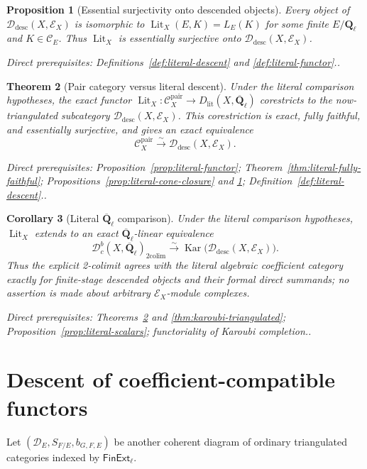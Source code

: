 \documentclass[10pt]{article}
\newtheorem{theorem}{Theorem}[section]
\newtheorem{proposition}[theorem]{Proposition}
\newtheorem{corollary}[theorem]{Corollary}
\theoremstyle{definition}
\newcommand{\Ql}{\mathbf Q_\ell}
\newcommand{\Qlb}{\overline{\mathbf Q}_\ell}
\newcommand{\Dbc}{\mathcal D^b_c}
\newcommand{\Kar}{\operatorname{Kar}}
\newcommand{\Pair}{\mathcal C_X^{\mathrm{pair}}}
\newcommand{\depends}[1]{\par\smallskip\noindent\textit{Direct prerequisites:} #1.}
\begin{document}
\begin{proposition}[Essential surjectivity onto descended objects]
\label{prop:literal-essential-surjectivity}
Every object of $\mathcal D_{\mathrm{desc}}(X,\mathcal E_X)$ is isomorphic
to $\operatorname{Lit}_X(E,K)=L_E(K)$ for some finite $E/\Ql$ and
$K\in\mathcal C_E$.  Thus $\operatorname{Lit}_X$ is essentially
surjective onto $\mathcal D_{\mathrm{desc}}(X,\mathcal E_X)$.
\depends{Definitions~\ref{def:literal-descent} and
\ref{def:literal-functor}.}
\end{proposition}

\begin{theorem}[Pair category versus literal descent]
\label{thm:pair-literal}
Under the literal comparison hypotheses, the exact functor
$\operatorname{Lit}_X:\Pair\to D_{\mathrm{lit}}(X,\Qlb)$ corestricts to
the now-triangulated subcategory
$\mathcal D_{\mathrm{desc}}(X,\mathcal E_X)$.  This corestriction is exact,
fully faithful, and essentially surjective, and gives an exact equivalence
\[
 \Pair\xrightarrow{\sim}
 \mathcal D_{\mathrm{desc}}(X,\mathcal E_X).
\]
\depends{Proposition~\ref{prop:literal-functor};
Theorem~\ref{thm:literal-fully-faithful};
Propositions~\ref{prop:literal-cone-closure} and
\ref{prop:literal-essential-surjectivity};
Definition~\ref{def:literal-descent}.}
\end{theorem}

\begin{corollary}[Literal $\Qlb$ comparison]
\label{cor:literal-comparison}
Under the literal comparison hypotheses, $\operatorname{Lit}_X$ extends to
an exact $\Qlb$-linear equivalence
\[
 \Dbc(X,\Qlb)_{\mathrm{2colim}}
 \xrightarrow{\sim}
 \Kar\bigl(\mathcal D_{\mathrm{desc}}(X,\mathcal E_X)\bigr).
\]
Thus the explicit 2-colimit agrees with the literal algebraic coefficient
category exactly for finite-stage descended objects and their formal direct
summands; no assertion is made about arbitrary
$\mathcal E_X$-module complexes.
\depends{Theorems~\ref{thm:pair-literal} and
\ref{thm:karoubi-triangulated};
Proposition~\ref{prop:literal-scalars}; functoriality of Karoubi completion.}
\end{corollary}

\section{Descent of coefficient-compatible functors}

Let $(\mathcal D_E,S_{F/E},b_{G,F,E})$ be another coherent diagram of
ordinary triangulated categories indexed by $\mathsf{FinExt}_\ell$.
\end{document}
